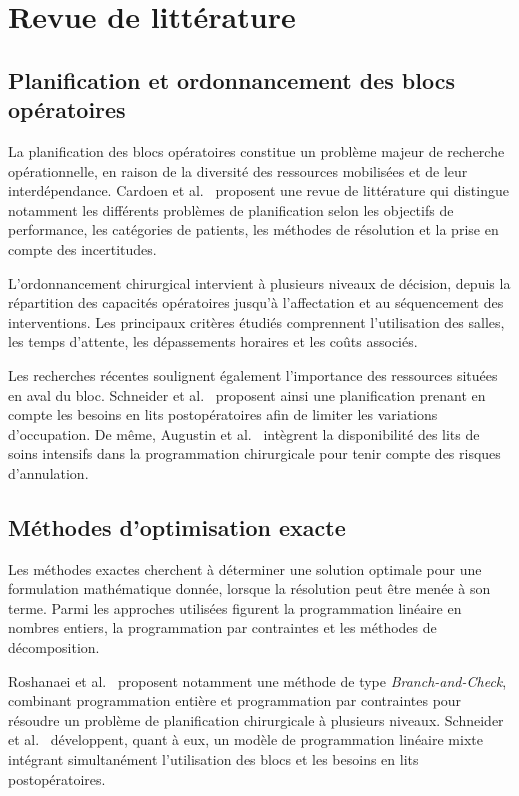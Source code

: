 \documentclass[11pt,a4paper]{article}
\begin{document}

\section{Revue de littérature}
\label{sec:lit}

\subsection{Planification et ordonnancement des blocs opératoires}

La planification des blocs opératoires constitue un problème majeur de recherche opérationnelle, en raison de la diversité des ressources mobilisées et de leur interdépendance. Cardoen et al.~\cite{cardoen2010} proposent une revue de littérature qui distingue notamment les différents problèmes de planification selon les objectifs de performance, les catégories de patients, les méthodes de résolution et la prise en compte des incertitudes.

L'ordonnancement chirurgical intervient à plusieurs niveaux de décision, depuis la répartition des capacités opératoires jusqu'à l'affectation et au séquencement des interventions. Les principaux critères étudiés comprennent l'utilisation des salles, les temps d'attente, les dépassements horaires et les coûts associés.

Les recherches récentes soulignent également l'importance des ressources situées en aval du bloc. Schneider et al.~\cite{schneider2020} proposent ainsi une planification prenant en compte les besoins en lits postopératoires afin de limiter les variations d'occupation. De même, Augustin et al.~\cite{augustin2022} intègrent la disponibilité des lits de soins intensifs dans la programmation chirurgicale pour tenir compte des risques d'annulation.

\subsection{Méthodes d'optimisation exacte}

Les méthodes exactes cherchent à déterminer une solution optimale pour une formulation mathématique donnée, lorsque la résolution peut être menée à son terme. Parmi les approches utilisées figurent la programmation linéaire en nombres entiers, la programmation par contraintes et les méthodes de décomposition.

Roshanaei et al.~\cite{roshanaei2020} proposent notamment une méthode de type \textit{Branch-and-Check}, combinant programmation entière et programmation par contraintes pour résoudre un problème de planification chirurgicale à plusieurs niveaux. Schneider et al.~\cite{schneider2020} développent, quant à eux, un modèle de programmation linéaire mixte intégrant simultanément l'utilisation des blocs et les besoins en lits postopératoires.
\end{document}
